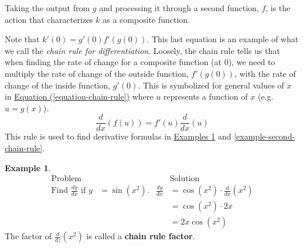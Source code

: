 \documentclass[12pt,]{book}
\newcommand{\terminology}[1]{\textbf{#1}}
\theoremstyle{plain}
\theoremstyle{definition}
\newtheorem{example}[theorem]{Example}
\numberwithin{equation}{section}
\newcounter{figstack}
\newcounter{figindex}
\newlength\fight
\newcommand\pushValignCaptionBottom[5][b]{%
\stepcounter{figstack}%
\expandafter\def\csname %
figalign\romannumeral\value{figstack}\endcsname{#1}%
\expandafter\def\csname %
figtype\romannumeral\value{figstack}\endcsname{#2}%
\expandafter\def\csname %
figwd\romannumeral\value{figstack}\endcsname{#3}%
\expandafter\def\csname %
figcontent\romannumeral\value{figstack}\endcsname{#4}%
\expandafter\def\csname %
figcap\romannumeral\value{figstack}\endcsname{#5}%
\setbox0=\hbox{%
\begin{#2}{#3}#4\end{#2}}%
\ifdim\dimexpr\ht0+\dp0\relax>\fight\global\setlength{\fight}{%
\dimexpr\ht0+\dp0\relax}\fi%
}
\newcommand\popValignCaptionBottom{%
\setcounter{figindex}{0}%
\hfill%
\whiledo{\value{figindex}<\value{figstack}}{%
\stepcounter{figindex}%
\def\tmp{\csname figwd\romannumeral\value{figindex}\endcsname}%
\begin{\csname figtype\romannumeral\value{figindex}\endcsname}[t]{\tmp}%
\centering%
\stackinset{c}{}%
{\csname figalign\romannumeral\value{figindex}\endcsname}{}%
{\csname figcontent\romannumeral\value{figindex}\endcsname}%
{\rule{0pt}{\fight}}\par%
\csname figcap\romannumeral\value{figindex}\endcsname%
\end{\csname figtype\romannumeral\value{figindex}\endcsname}%
\hfill%
}%
\setcounter{figstack}{0}%
\setlength{\fight}{0pt}%
\hfill%
}
\newcommand{\fe}[2]{#1\mathopen{}\left(#2\right)\mathclose{}}
\newcommand{\fd}[1]{#1'}
\newcommand{\lz}[2]{\frac{d#1}{d#2}}
\newcommand{\lzoo}[2]{{\frac{d}{d#1}}{\left(#2\right)}}
\begin{document}
\par
Taking the output from \(g\) and processing it through a second function, \(f\), is the action that characterizes \(k\) as a composite function.%
\par
Note that \(\fe{\fd{k}}{0}=\fe{\fd{g}}{0}\fe{\fd{f}}{\fe{g}{0}}\).  This last equation is an example of what we call the \emph{chain rule for differentiation}. Loosely, the chain rule tells us that when finding the rate of change for a composite function (at \(0\)), we need to multiply the rate of change of the outside function, \(\fe{\fd{f}}{\fe{g}{0}}\), with the rate of change of the inside function, \(\fe{\fd{g}}{0}\).  This is symbolized for general values of \(x\) in \hyperref[equation-chain-rule]{Equation (\ref{equation-chain-rule})} where \(u\) represents a function of \(x\) (e.g.\@ \(u=\fe{g}{x}\)). \begin{equation}\lzoo{x}{\fe{f}{u}}=\fe{\fd{f}}{u}\lzoo{x}{u}\label{equation-chain-rule}\end{equation}This rule is used to find derivative formulas in \hyperref[example-chain-rule]{Examples \ref{example-chain-rule}} and \hyperref[example-second-chain-rule]{\ref{example-second-chain-rule}}.%
\begin{example}\label{example-chain-rule}
\begin{align*}
\text{Problem}&&&\text{Solution}\\
\text{Find }\lz{y}{x}\text{ if }y&=\fe{\sin}{x^2}\text{.}&\lz{y}{x}&=\fe{\cos}{x^2}\cdot\lzoo{x}{x^2}\\
&&&=\fe{\cos}{x^2}\cdot2x\\
&&&=2x\fe{\cos}{x^2}
\end{align*}The factor of \(\lzoo{z}{x^2}\) is called a \terminology{chain rule factor}.%
\end{example}
\end{document}
